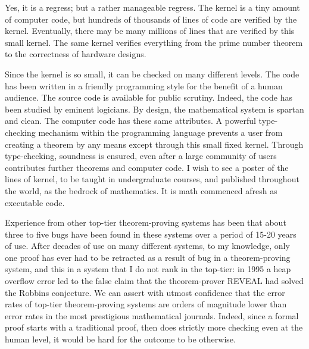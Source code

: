 \documentclass{llncs}
\begin{document}



Yes, it is a regress; but a rather manageable regress.  The kernel
is a tiny amount of computer code, but hundreds of thousands of lines of code  are
verified by the kernel.  Eventually, there may be many millions of lines that are
verified by this small kernel.  The same kernel verifies everything from
the prime number theorem to the correctness of hardware designs.

Since the kernel is so small, it can be checked on many different levels.  The
code has been written in a friendly programming style for the benefit
of a human audience.  The source code is available for public scrutiny.   Indeed, the code
has been studied by eminent logicians.  
By design, the mathematical system is spartan
and clean.  The computer code has these same attributes.   A powerful type-checking mechanism within the programming language prevents a user from creating a theorem by any means except through this small fixed kernel.  Through type-checking, soundness is ensured, even after
a large community of users contributes further theorems and computer code. 
I wish to see a poster of the lines of kernel, to be taught in undergraduate courses, and published throughout the world, as
the bedrock of mathematics.  It is math commenced afresh
as executable code.

Experience from other top-tier theorem-proving systems has been that about three to five bugs have been found
in these systems over a period of 15-20 years of use.  After decades of use on many different
systems, to my knowledge, only one proof
has ever had to be retracted as a result of bug in a theorem-proving system,
and this in a system that I do not rank in the top-tier:  in 1995
a heap overflow error led to the false claim that the theorem-prover REVEAL had solved the Robbins
conjecture. %
We can assert with utmost confidence that 
the error rates of top-tier theorem-proving systems are 
orders of magnitude lower than
error rates in the most prestigious mathematical journals.  Indeed, since a formal proof starts with
a traditional proof, then does strictly more checking even at the human level, 
it would be hard for the outcome to be otherwise.
\end{document}
